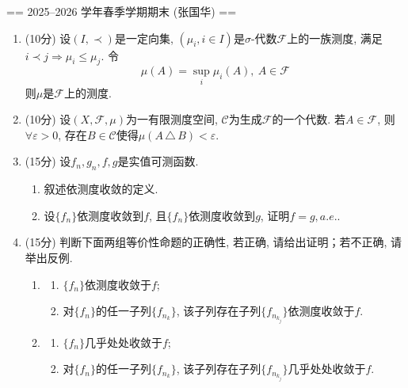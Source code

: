 
== 2025--2026 学年春季学期期末 (张国华) ==
\begin{enumerate}
  \item[一、] (10分)
   设$(I, \prec)$是一定向集, $(\mu_{i},i\in I)$是$\sigma$-代数$\mathcal{F}$上的一族测度, 满足$i \prec j \Longrightarrow \mu_{i} \leq \mu_{j}$. 令
   \begin{equation*}
    \mu(A)=\sup_{i}\mu_{i}(A), \ A \in \mathcal{F}
   \end{equation*}
    则$\mu$是$\mathcal{F}$上的测度.

  \item[二、] (10分)
  设$(X ,\mathcal{F},\mu)$为一有限测度空间, $\mathcal{C}$为生成$\mathcal{F}$的一个代数. 若$A \in \mathcal{F}$, 则$\forall \varepsilon >0$, 
  存在$B \in \mathcal{C}$使得$\mu(A\,\triangle\,B)< \varepsilon$.

  \item[三、] (15分)
  设$f_n,g_n,f,g$是实值可测函数.
  \begin{enumerate}[label=(\arabic*)]
    \item 叙述依测度收敛的定义.
    \item 设$\{f_n\}$依测度收敛到$f$, 且$\{f_n\}$依测度收敛到$g$, 证明$f=g, a.e.$.
  \end{enumerate}
 
  \item[四、] (15分)
  判断下面两组等价性命题的正确性, 若正确, 请给出证明；若不正确, 请举出反例.
  \begin{enumerate}[label=\arabic*.]
    \item
    \begin{enumerate}
        \item[(1)] $\{f_n\}$依测度收敛于$f$;
        \item[(2)] 对$\{f_n\}$的任一子列$\{f_{n_k}\}$, 该子列存在子列$\{f_{n_{k_j}}\}$依测度收敛于$f$.
    \end{enumerate}
    \item
    \begin{enumerate}
        \item[(3)] $\{f_n\}$几乎处处收敛于$f$;
        \item[(4)] 对$\{f_n\}$的任一子列$\{f_{n_k}\}$, 该子列存在子列$\{f_{n_{k_j}}\}$几乎处处收敛于$f$.
    \end{enumerate}
  \end{enumerate}


\end{enumerate}
